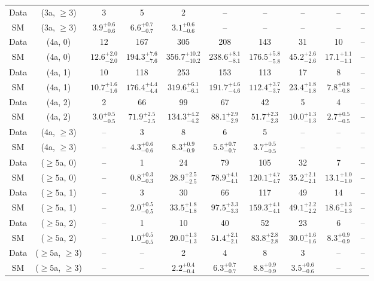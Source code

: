 \begin{table}[h!]
{\begin{tabular}{cccccccccc}
	Data & (3a, $\ge3$) & 3 & 5 & 2 & -- & -- & -- & -- & -- \\[0.5ex] 
	SM & (3a, $\ge3$) & $3.9^{+ 0.6 }_{- 0.6 }$ & $6.6^{+ 0.7 }_{- 0.7 }$ & $3.1^{+ 0.6 }_{- 0.6 }$ & -- & -- & -- & -- & -- \\[0.5ex] 
	Data & (4a, 0) & 12 & 167 & 305 & 208 & 143 & 31 & 10 & -- \\[0.5ex] 
	SM & (4a, 0) & $12.6^{+ 2.0 }_{- 2.0 }$ & $194.3^{+ 7.6 }_{- 7.6 }$ & $356.7^{+ 10.2 }_{- 10.2 }$ & $238.6^{+ 8.1 }_{- 8.1 }$ & $176.5^{+ 5.8 }_{- 5.8 }$ & $45.2^{+ 2.6 }_{- 2.6 }$ & $17.1^{+ 1.1 }_{- 1.1 }$ & -- \\[0.5ex] 
	Data & (4a, 1) & 10 & 118 & 253 & 153 & 113 & 17 & 8 & -- \\[0.5ex] 
	SM & (4a, 1) & $10.7^{+ 1.6 }_{- 1.6 }$ & $176.4^{+ 4.4 }_{- 4.4 }$ & $319.6^{+ 6.1 }_{- 6.1 }$ & $191.7^{+ 4.6 }_{- 4.6 }$ & $112.4^{+ 3.7 }_{- 3.7 }$ & $23.4^{+ 1.8 }_{- 1.8 }$ & $7.8^{+ 0.8 }_{- 0.8 }$ & -- \\[0.5ex] 
	Data & (4a, 2) & 2 & 66 & 99 & 67 & 42 & 5 & 4 & -- \\[0.5ex] 
	SM & (4a, 2) & $3.0^{+ 0.5 }_{- 0.5 }$ & $71.9^{+ 2.5 }_{- 2.5 }$ & $134.3^{+ 4.2 }_{- 4.2 }$ & $88.1^{+ 2.9 }_{- 2.9 }$ & $51.7^{+ 2.3 }_{- 2.3 }$ & $10.0^{+ 1.3 }_{- 1.3 }$ & $2.7^{+ 0.5 }_{- 0.5 }$ & -- \\[0.5ex] 
	Data & (4a, $\ge3$) & -- & 3 & 8 & 6 & 5 & -- & -- & -- \\[0.5ex] 
	SM & (4a, $\ge3$) & -- & $4.3^{+ 0.6 }_{- 0.6 }$ & $8.3^{+ 0.9 }_{- 0.9 }$ & $5.5^{+ 0.7 }_{- 0.7 }$ & $3.7^{+ 0.5 }_{- 0.5 }$ & -- & -- & -- \\[0.5ex] 
	Data & ($\ge5$a, 0) & -- & 1 & 24 & 79 & 105 & 32 & 7 & -- \\[0.5ex] 
	SM & ($\ge5$a, 0) & -- & $0.8^{+ 0.3 }_{- 0.3 }$ & $28.9^{+ 2.5 }_{- 2.5 }$ & $78.9^{+ 4.1 }_{- 4.1 }$ & $120.1^{+ 4.7 }_{- 4.7 }$ & $35.2^{+ 2.1 }_{- 2.1 }$ & $13.1^{+ 1.0 }_{- 1.0 }$ & -- \\[0.5ex] 
	Data & ($\ge5$a, 1) & -- & 3 & 30 & 66 & 117 & 49 & 14 & -- \\[0.5ex] 
	SM & ($\ge5$a, 1) & -- & $2.0^{+ 0.5 }_{- 0.5 }$ & $33.5^{+ 1.8 }_{- 1.8 }$ & $97.5^{+ 3.3 }_{- 3.3 }$ & $159.3^{+ 4.1 }_{- 4.1 }$ & $49.1^{+ 2.2 }_{- 2.2 }$ & $18.6^{+ 1.3 }_{- 1.3 }$ & -- \\[0.5ex] 
	Data & ($\ge5$a, 2) & -- & 1 & 10 & 40 & 52 & 23 & 6 & -- \\[0.5ex] 
	SM & ($\ge5$a, 2) & -- & $1.0^{+ 0.5 }_{- 0.5 }$ & $20.0^{+ 1.3 }_{- 1.3 }$ & $51.4^{+ 2.1 }_{- 2.1 }$ & $83.8^{+ 2.8 }_{- 2.8 }$ & $30.0^{+ 1.6 }_{- 1.6 }$ & $8.3^{+ 0.9 }_{- 0.9 }$ & -- \\[0.5ex] 
	Data & ($\ge5$a, $\ge3$) & -- & -- & 2 & 4 & 8 & 3 & -- & -- \\[0.5ex] 
	SM & ($\ge5$a, $\ge3$) & -- & -- & $2.2^{+ 0.4 }_{- 0.4 }$ & $6.3^{+ 0.7 }_{- 0.7 }$ & $8.8^{+ 0.9 }_{- 0.9 }$ & $3.5^{+ 0.6 }_{- 0.6 }$ & -- & -- \\[0.5ex] 
	\hline
	\hline
\end{tabular}}
\end{table}
